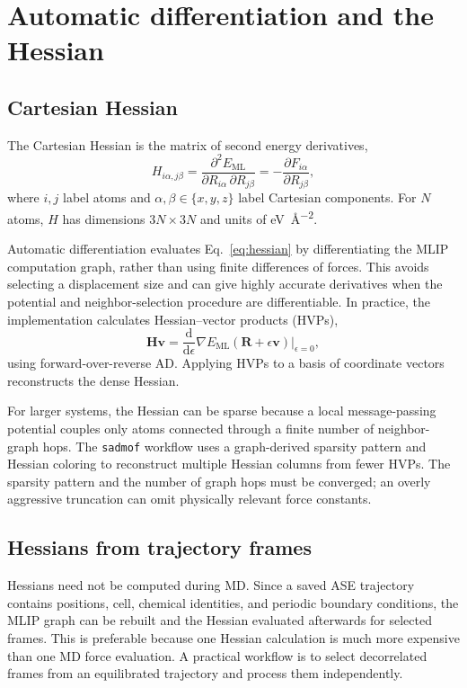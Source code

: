 \documentclass[11pt,a4paper]{article}
\begin{document}
\section{Automatic differentiation and the Hessian}

\subsection{Cartesian Hessian}

The Cartesian Hessian is the matrix of second energy derivatives,
\begin{equation}
  H_{i\alpha,j\beta} =
  \frac{\partial^2 E_{\mathrm{ML}}}
       {\partial R_{i\alpha}\,\partial R_{j\beta}}
  = -\frac{\partial F_{i\alpha}}{\partial R_{j\beta}},
  \label{eq:hessian}
\end{equation}
where $i,j$ label atoms and $\alpha,\beta\in\{x,y,z\}$ label Cartesian components. For $N$ atoms, $H$ has dimensions $3N\times3N$ and units of \si{eV\per\angstrom\squared}.

Automatic differentiation evaluates Eq.~\eqref{eq:hessian} by differentiating the MLIP computation graph, rather than using finite differences of forces. This avoids selecting a displacement size and can give highly accurate derivatives when the potential and neighbor-selection procedure are differentiable. In practice, the implementation calculates Hessian--vector products (HVPs),
\begin{equation}
  \bm{H}\bm{v} = \frac{\mathrm{d}}{\mathrm{d}\epsilon}
  \nabla E_{\mathrm{ML}}(\bm{R}+\epsilon\bm{v})\bigg|_{\epsilon=0},
\end{equation}
using forward-over-reverse AD. Applying HVPs to a basis of coordinate vectors reconstructs the dense Hessian.

For larger systems, the Hessian can be sparse because a local message-passing potential couples only atoms connected through a finite number of neighbor-graph hops. The \texttt{sadmof} workflow uses a graph-derived sparsity pattern and Hessian coloring to reconstruct multiple Hessian columns from fewer HVPs. The sparsity pattern and the number of graph hops must be converged; an overly aggressive truncation can omit physically relevant force constants.

\subsection{Hessians from trajectory frames}

Hessians need not be computed during MD. Since a saved ASE trajectory contains positions, cell, chemical identities, and periodic boundary conditions, the MLIP graph can be rebuilt and the Hessian evaluated afterwards for selected frames. This is preferable because one Hessian calculation is much more expensive than one MD force evaluation. A practical workflow is to select decorrelated frames from an equilibrated trajectory and process them independently.
\end{document}
